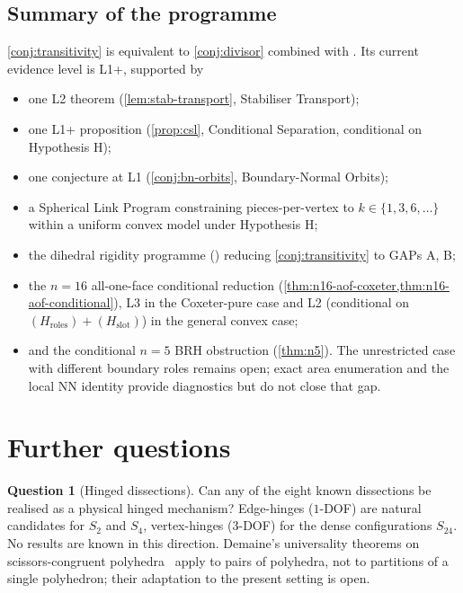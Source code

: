 \documentclass[11pt,a4paper]{article}
\theoremstyle{plain}
\theoremstyle{definition}
\newtheorem{question}[question]{Question}
\theoremstyle{remark}
\newcommand{\Hroles}{H_{\mathrm{roles}}}
\newcommand{\Hslot}{H_{\mathrm{slot}}}
\begin{document}
\subsection{Summary of the programme}\label{ssec:prog-summary}

\cref{conj:transitivity} is equivalent to \cref{conj:divisor} combined with
.  Its current evidence level is \textsf{L1+}, supported
by
\begin{itemize}
  \item one \textsf{L2} theorem (\cref{lem:stab-transport}, Stabiliser Transport);
  \item one \textsf{L1+} proposition (\cref{prop:csl}, Conditional Separation,
        conditional on Hypothesis H);
  \item one conjecture at \textsf{L1} (\cref{conj:bn-orbits}, Boundary-Normal
        Orbits);
  \item a Spherical Link Program constraining pieces-per-vertex to
        $k \in \{1, 3, 6, \ldots\}$ within a uniform convex model under
        Hypothesis H;
  \item the dihedral rigidity programme () reducing
        \cref{conj:transitivity} to GAPs A, B;
  \item the $n = 16$ all-one-face conditional reduction
        (\cref{thm:n16-aof-coxeter,thm:n16-aof-conditional}), \textsf{L3} in the
        Coxeter-pure case and \textsf{L2} (conditional on
        $(\Hroles)+(\Hslot)$) in the general convex case;
  \item and the conditional $n = 5$ BRH obstruction
        (\cref{thm:n5}).  The unrestricted case with different boundary roles
        remains open; exact area enumeration and the local NN identity provide
        diagnostics but do not close that gap.
\end{itemize}

\section{Further questions}\label{sec:further}

\begin{question}[Hinged dissections]\label{q:hinged}
Can any of the eight known dissections be realised as a physical hinged
mechanism?  Edge-hinges ($1$-DOF) are natural candidates for $S_{2}$ and
$S_{4}$, vertex-hinges ($3$-DOF) for the dense configurations $S_{24}$.
No results are known in this direction.  Demaine's universality theorems
on scissors-congruent polyhedra~\cite{DemaineDemaine2007} apply to pairs
of polyhedra, not to partitions of a single polyhedron; their adaptation
to the present setting is open.
\end{question}
\end{document}
